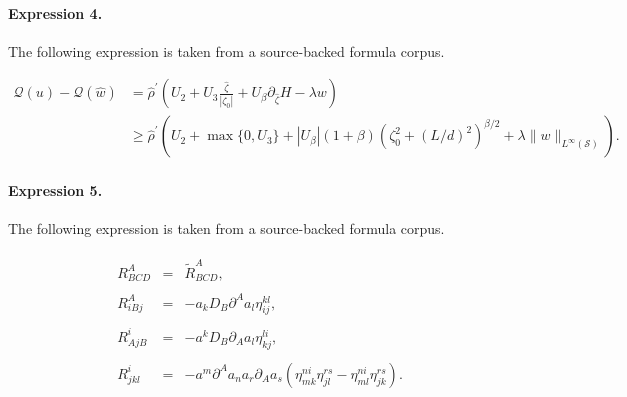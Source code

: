 \documentclass[11pt]{article}
\begin{document}
\paragraph{Expression 4.} The following expression is taken from a source-backed formula corpus.

\begin{align*} \mathcal{Q}(u) - \mathcal{Q}(\hat w) &= \hat{\rho}^\prime \left( U_2 + U_3 \frac{\hat \zeta}{|\zeta_0|} + U_\beta \partial_{\hat \zeta} H - \lambda w \right) \\& \geq \hat{\rho}^\prime \left( U_2 + \max\{ 0, U_3\} + |U_\beta| (1+\beta)(\zeta_0^2+(L/d)^2)^{\beta/2} + \lambda \| w \|_{L^\infty(\mathcal{S})} \right). \end{align*}

\paragraph{Expression 5.} The following expression is taken from a source-backed formula corpus.

\begin{align*}\begin{array}{ccc}R_{BCD}^A & = & \tilde{R}_{BCD}^A, \\ & & \\ R_{iBj}^A & = & -a_kD_B\partial ^Aa_l\eta _{ij}^{kl}, \\ & & \\ R_{AjB}^i & = & -a^kD_B\partial _Aa_l\eta _{kj}^{li}, \\ & & \\ R_{jkl}^i & = & -a^m\partial ^Aa_na_r\partial _Aa_s(\eta _{mk}^{ni}\eta_{jl}^{rs}-\eta _{ml}^{ni}\eta _{jk}^{rs}).\end{array}\end{align*}
\end{document}

